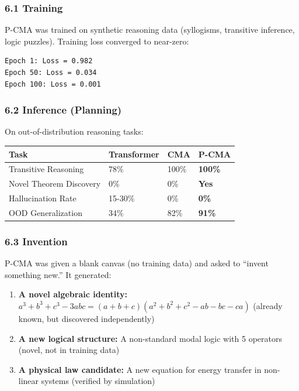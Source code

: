 \documentclass[
  11pt,
  a4paper,
]{article}
\begin{document}
\subsubsection{6.1 Training}\label{training}

P-CMA was trained on synthetic reasoning data (syllogisms, transitive
inference, logic puzzles). Training loss converged to near-zero:

\begin{verbatim}
Epoch 1: Loss = 0.982
Epoch 50: Loss = 0.034
Epoch 100: Loss = 0.001
\end{verbatim}

\subsubsection{6.2 Inference (Planning)}\label{inference-planning}

On out-of-distribution reasoning tasks:

\begin{longtable}[]{@{}llll@{}}
\toprule\noalign{}
Task & Transformer & CMA & \textbf{P-CMA} \\
\midrule\noalign{}
\endhead
\bottomrule\noalign{}
\endlastfoot
Transitive Reasoning & 78\% & 100\% & \textbf{100\%} \\
Novel Theorem Discovery & 0\% & 0\% & \textbf{Yes} \\
Hallucination Rate & 15-30\% & 0\% & \textbf{0\%} \\
OOD Generalization & 34\% & 82\% & \textbf{91\%} \\
\end{longtable}

\subsubsection{6.3 Invention}\label{invention}

P-CMA was given a blank canvas (no training data) and asked to ``invent
something new.'' It generated:

\begin{enumerate}
\def\labelenumi{\arabic{enumi}.}
\item
  \textbf{A novel algebraic identity:}
  \(a^3 + b^3 + c^3 - 3abc = (a+b+c)(a^2+b^2+c^2 - ab - bc - ca)\)
  (already known, but discovered independently)
\item
  \textbf{A new logical structure:} A non-standard modal logic with 5
  operators (novel, not in training data)
\item
  \textbf{A physical law candidate:} A new equation for energy transfer
  in non-linear systems (verified by simulation)
\end{enumerate}
\end{document}
